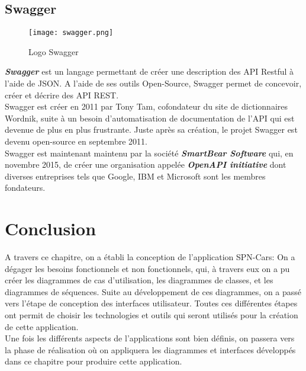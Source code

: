 \subsection{Swagger}
\vspace{1cm}
\begin{figure}[H]
    \centering
    \texttt{[image: swagger.png]}
    \vspace{1cm}
    \captionsetup{justification=centering}

    \caption{Logo Swagger}
    \label{fig:swagger_logo}
\end{figure}
\textit{\textbf{Swagger}} \cite{swagger} est un langage permettant de créer une description des API Restful à l'aide de JSON. A l'aide de ses outils Open-Source, Swagger permet de concevoir, créer et décrire des API REST.\\
\noindent Swagger est créer en 2011 par Tony Tam, cofondateur du site de dictionnaires Wordnik, suite à un besoin d'automatisation de documentation de l'API qui est devenue de plus en plus frustrante. Juste après sa création, le projet Swagger est devenu open-source en septembre 2011.\\
\noindent Swagger est maintenant maintenu par la société \textit{\textbf{SmartBear Software}} qui, en novembre 2015, de créer une organisation appelée \textit{\textbf{OpenAPI initiative}} dont diverses entreprises tels que Google, IBM et Microsoft sont les membres fondateurs.\\
\section*{Conclusion}
A travers ce chapitre, on a établi la conception de l'application SPN-Cars: On a dégager les besoins fonctionnels et non fonctionnels, qui, à travers eux on a pu créer les diagrammes de cas d'utilisation, les diagrammes de classes, et les diagrammes de séquences. Suite au développement de ces diagrammes, on a passé vers l'étape de conception des interfaces utilisateur. Toutes ces différentes étapes ont permit de choisir les technologies et outils qui seront utilisés pour la création de cette application.\\
Une fois les différents aspects de l'applications sont bien définis, on passera vers la phase de réalisation où on appliquera les diagrammes et interfaces développés dans ce chapitre pour produire cette application.